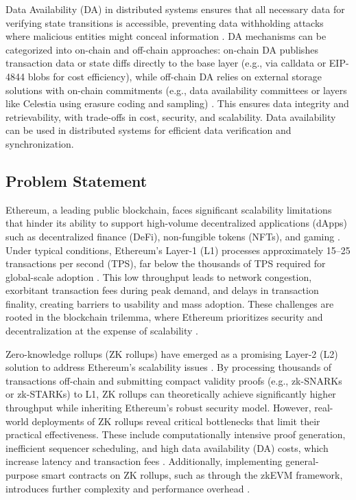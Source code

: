 \vspace{12pt}

Data Availability (DA) in distributed systems ensures that all necessary data for verifying state transitions is accessible, preventing data withholding attacks where malicious entities might conceal information \cite{motepalli2023sok}. DA mechanisms can be categorized into on-chain and off-chain approaches: on-chain DA publishes transaction data or state diffs directly to the base layer (e.g., via calldata or EIP-4844 blobs for cost efficiency), while off-chain DA relies on external storage solutions with on-chain commitments (e.g., data availability committees or layers like Celestia using erasure coding and sampling) \cite{gogol2025scalingdefi, lavaur2023modular}. This ensures data integrity and retrievability, with trade-offs in cost, security, and scalability.
Data availability can be used in distributed systems for efficient data verification and synchronization.

\vspace{12pt}
\subsection{Problem Statement}
\vspace{12pt}

Ethereum, a leading public blockchain, faces significant scalability limitations that hinder its ability to support high-volume decentralized applications (dApps) such as decentralized finance (DeFi), non-fungible tokens (NFTs), and gaming \cite{buterin2014ethereum}. Under typical conditions, Ethereum’s Layer-1 (L1) processes approximately 15–25 transactions per second (TPS), far below the thousands of TPS required for global-scale adoption \cite{wood2014ethereum, zhou2020solutions}. This low throughput leads to network congestion, exorbitant transaction fees during peak demand, and delays in transaction finality, creating barriers to usability and mass adoption. These challenges are rooted in the blockchain trilemma, where Ethereum prioritizes security and decentralization at the expense of scalability \cite{fu2024trilemma}.
\vspace{12pt}

Zero-knowledge rollups (ZK rollups) have emerged as a promising Layer-2 (L2) solution to address Ethereum’s scalability issues \cite{tran2023implementation}. By processing thousands of transactions off-chain and submitting compact validity proofs (e.g., zk-SNARKs or zk-STARKs) to L1, ZK rollups can theoretically achieve significantly higher throughput while inheriting Ethereum’s robust security model. However, real-world deployments of ZK rollups reveal critical bottlenecks that limit their practical effectiveness. These include computationally intensive proof generation, inefficient sequencer scheduling, and high data availability (DA) costs, which increase latency and transaction fees \cite{habib2025bottlenecks}. Additionally, implementing general-purpose smart contracts on ZK rollups, such as through the zkEVM framework, introduces further complexity and performance overhead \cite{chaliasos2024analyzing}.

